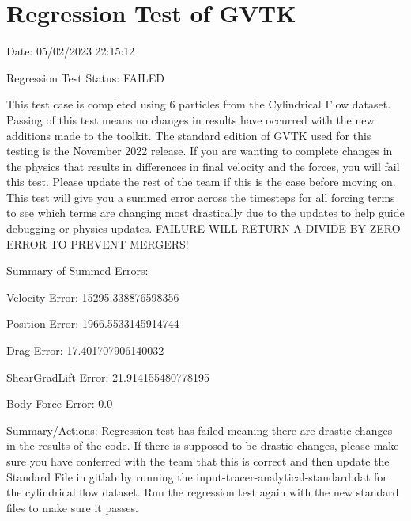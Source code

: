 \documentclass{article}
\begin{document}
\section{Regression Test of GVTK}
Date: 05/02/2023 22:15:12

\vspace{5pt}

\noindent Regression Test Status: FAILED

\vspace{5pt}

\noindent This test case is completed using 6 particles from the Cylindrical Flow dataset. Passing of this test means no changes in results have occurred with the new additions made to the toolkit.
The standard edition of GVTK used for this testing is the November 2022 release. If you are wanting to complete changes in the physics that results in differences in final velocity and the forces,
you will fail this test. Please update the rest of the team if this is the case before moving on. This test will give you a summed error across the timesteps for all forcing terms to see which terms
are changing most drastically due to the updates to help guide debugging or physics updates. FAILURE WILL RETURN A DIVIDE BY ZERO ERROR TO PREVENT MERGERS!



\vspace{5pt}

\noindent Summary of Summed Errors:
\vspace{5pt}

Velocity Error: 15295.338876598356

Position Error: 1966.5533145914744

Drag Error: 17.401707906140032

ShearGradLift Error: 21.914155480778195

Body Force Error: 0.0

\vspace{5pt}

\noindent Summary/Actions: Regression test has failed meaning there are drastic changes in the results of the code. 
If there is supposed to be drastic changes, please make sure you have conferred with the team that this is correct and then update the Standard File in gitlab by running the input-tracer-analytical-standard.dat for the cylindrical flow dataset.
Run the regression test again with the new standard files to make sure it passes.

\vspace{5pt}
\end{document}
